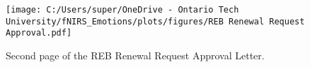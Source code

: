 \begin{figure}[H]
    \centering
    \texttt{[image: C:/Users/super/OneDrive - Ontario Tech University/fNIRS\_Emotions/plots/figures/REB Renewal Request Approval.pdf]}
    \caption[REB Renewal Request Approval Letter (Second Page)]{Second page of the REB Renewal Request Approval Letter.}
    \label{fig:appendix_reb_renewal_second_page}
\end{figure}